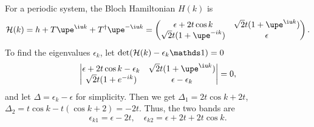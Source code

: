 \begin{solution}
  For a periodic system, the Bloch Hamiltonian $H(k)$ is
  \[
    \mathcal H(k) = h + T \upe^{\iu k} + T^\dagger \upe^{-\iu k}
  = \begin{pmatrix}
      \epsilon + 2t \cos k & \sqrt2t (1 + \upe^{\iu k}) \\
      \sqrt2t (1 + \upe^{-ik}) & \epsilon
  \end{pmatrix}.
  \]
  To find the eigenvalues $\epsilon_k$,
  let $\det(\mathcal H(k) - \epsilon_k\identity) = 0$
  \[
  \begin{vmatrix}
  \epsilon + 2t \cos k - \epsilon_k & \sqrt2t (1 + \upe^{\iu k}) \\
  \sqrt2t (1 + e^{-ik}) & \epsilon - \epsilon_k
  \end{vmatrix} = 0,
  \]
  and let $\Delta = \epsilon_k - \epsilon$ for simplicity. Then we get
  $\Delta_1 = 2t \cos k + 2t$, $\Delta_2 = t \cos k - t (\cos k + 2) = -2t$.
  Thus, the two bands are
  \[
    \epsilon_{k1} = \epsilon - 2t, \quad
    \epsilon_{k2} = \epsilon + 2t + 2t \cos k.
  \]
\end{solution}